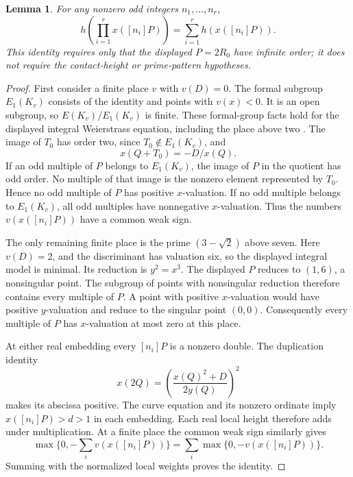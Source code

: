 \documentclass[11pt,a4paper]{article}
\newtheorem{lemma}[theorem]{Lemma}
\theoremstyle{definition}
\theoremstyle{remark}
\begin{document}
\begin{lemma}\label{lem:u29-product}
For any nonzero odd integers $n_1,\ldots,n_r$,
\[
 h\left(\prod_{i=1}^r x([n_i]P)\right)
       =\sum_{i=1}^r h(x([n_i]P)).
\]
This identity requires only that the displayed $P=2R_0$ have infinite
order; it does not require the contact-height or prime-pattern hypotheses.
\end{lemma}
\begin{proof}
First consider a finite place $v$ with $v(D)=0$.  The formal subgroup
$E_1(K_v)$ consists of the identity and points with $v(x)<0$.
It is an open subgroup, so $E(K_v)/E_1(K_v)$ is finite.  These formal-group facts hold for the displayed integral Weierstrass
equation, including the place above two \cite[Chapter~VII]{Silverman2009}.  The image of $T_0$ has order two, since
$T_0\notin E_1(K_v)$, and
\[
                    x(Q+T_0)=-D/x(Q).
\]
If an odd multiple of $P$ belongs to $E_1(K_v)$, the image of $P$
in the quotient has odd order.  No multiple of that image is the
nonzero element represented by $T_0$.  Hence no odd multiple of $P$
has positive $x$-valuation.  If no odd multiple belongs to $E_1(K_v)$,
all odd multiples have nonnegative $x$-valuation.  Thus the numbers
$v(x([n_i]P))$ have a common weak sign.

The only remaining finite place is the prime $(3-\sqrt2)$ above seven.
Here $v(D)=2$, and the discriminant has valuation six, so the displayed
integral model is minimal.  Its reduction is $y^2=x^3$.
The displayed $P$ reduces to $(1,6)$, a nonsingular point.  The subgroup
of points with nonsingular reduction therefore contains every multiple
of $P$.  A point with positive $x$-valuation would have positive
$y$-valuation and reduce to the singular point $(0,0)$.  Consequently
every multiple of $P$ has $x$-valuation at most zero at this place.

At either real embedding every $[n_i]P$ is a nonzero double.  The
duplication identity
\[
 x(2Q)=\left(\frac{x(Q)^2+D}{2y(Q)}\right)^2
\]
makes its abscissa positive.  The curve equation and its nonzero
ordinate imply $x([n_i]P)>d>1$ in each embedding.  Each real local
height therefore adds under multiplication.  At a finite place the
common weak sign similarly gives
\[
 \max\{0,-\textstyle\sum_i v(x([n_i]P))\}
       =\sum_i\max\{0,-v(x([n_i]P))\}.
\]
Summing with the normalized local weights proves the identity.
\end{proof}
\end{document}
